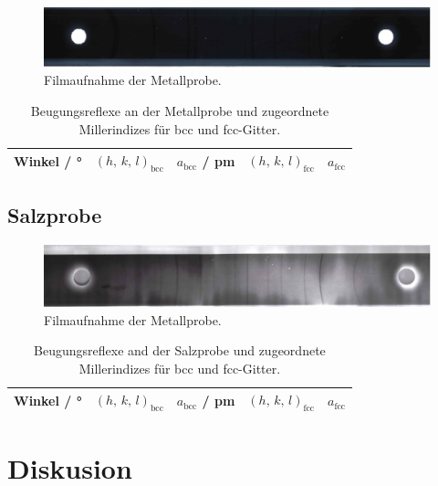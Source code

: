 \begin{figure}
  \centering
  \includegraphics[scale=0.5]{content/pics/Metall_film.pdf}
  \caption{Filmaufnahme der Metallprobe.}
  \label{Abb:Metall}
\end{figure}

\begin{table}[H]
  \centering
  \caption{Beugungsreflexe an der Metallprobe und zugeordnete Millerindizes für bcc und fcc-Gitter.}
  \label{Tab:Metall}
  \begin{tabular}{c || c c | c c}
    \toprule
    Winkel / ° & $(h, \, k, \, l)_{\text{bcc}}$ & $a_{\text{bcc}}$ / pm & $(h, \, k, \, l)_{\text{fcc}}$ & $a_{\text{fcc}}$\\
    \midrule
    
    \bottomrule
  \end{tabular}
\end{table}

\subsection{Salzprobe}

\begin{figure}
  \centering
  \includegraphics[scale=0.5]{content/pics/Salz_film.pdf}
  \caption{Filmaufnahme der Metallprobe.}
  \label{Abb:Salz}
\end{figure}

\begin{table}[H]
  \centering
  \caption{Beugungsreflexe and der Salzprobe und zugeordnete Millerindizes für bcc und fcc-Gitter.}
  \label{Tab:Salz}
  \begin{tabular}{c || c c | c c}
    \toprule
    Winkel / ° & $(h, \, k, \, l)_{\text{bcc}}$ & $a_{\text{bcc}}$ / pm & $(h, \, k, \, l)_{\text{fcc}}$ & $a_{\text{fcc}}$\\
    \midrule
    
    \bottomrule
  \end{tabular}
\end{table}

\section{Diskusion}
